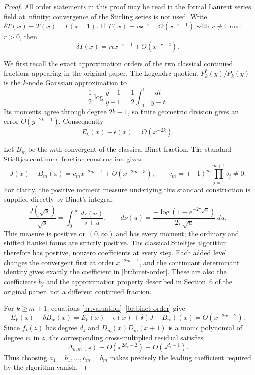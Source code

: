 \documentclass[11pt,a4paper]{article}
\theoremstyle{definition}
\theoremstyle{remark}
\numberwithin{equation}{section}
\begin{document}
\begin{proof}
All order statements in this proof may be read in the formal Laurent
series field at infinity; convergence of the Stirling series is not
used. Write $\delta T(x)=T(x)-T(x+1)$. If
$T(x)=c x^{-r}+O(x^{-r-1})$ with $c\ne0$ and $r>0$, then
\begin{equation}\label{br:valuation}
 \delta T(x)=r c x^{-r-1}+O(x^{-r-2}).
\end{equation}

We first recall the exact approximation orders of the two classical
continued fractions appearing in the original paper. The Legendre
quotient $P_k^*(y)/P_k(y)$ is the $k$-node Gaussian approximation to
\[
 \frac12\log\frac{y+1}{y-1}
       =\frac12\int_{-1}^1\frac{dt}{y-t}.
\]
Its moments agree through degree $2k-1$, so finite geometric
division gives an error $O(y^{-2k-1})$. Consequently
\begin{equation}\label{br:legendre-order}
 E_k(x)-\epsilon(x)=O(x^{-2k}).
\end{equation}

Let $B_m$ be the $m$th convergent of the classical Binet fraction.
The standard Stieltjes continued-fraction construction gives
\begin{equation}\label{br:binet-order}
 J(x)-B_m(x)=c_m x^{-2m-1}+O(x^{-2m-3}),
 \qquad c_m=(-1)^m\prod_{j=1}^{m+1}b_j\ne0.
\end{equation}
For clarity, the positive moment measure underlying this standard
construction is supplied directly by Binet's integral:
\[
 \frac{J(\sqrt s)}{\sqrt s}
 =\int_0^\infty\frac{d\nu(u)}{s+u},\qquad
 d\nu(u)=\frac{-\log(1-e^{-2\pi\sqrt u})}{2\pi\sqrt u}\,du.
\]
This measure is positive on $(0,\infty)$ and has every moment;
the ordinary and shifted Hankel forms are strictly positive.
The classical Stieltjes algorithm therefore has positive,
nonzero coefficients at every step. Each added level changes the
convergent first at order $x^{-2m-1}$, and the continuant determinant
identity gives exactly the coefficient in
\eqref{br:binet-order}. These are also the coefficients $b_j$ and
the approximation property described in Section~6 of the original
paper, not a different continued fraction.

For $k\ge m+1$, equations \eqref{br:valuation}--\eqref{br:binet-order}
give
\[
 E_k(x)-\delta B_m(x)
  =E_k(x)-\epsilon(x)+\delta(J-B_m)(x)
  =O(x^{-2m-2}).
\]
Since $f_k(z)$ has degree $d_k$ and
$D_m(x)D_m(x+1)$ is a monic polynomial of degree $m$ in $z$, the
corresponding cross-multiplied residual satisfies
\[
 \Delta_{k,m}(z)=O(x^{2d_k-2})=O(z^{d_k-1}).
\]
Thus choosing $a_1=b_1,\ldots,a_m=b_m$ makes precisely the
leading coefficient required by the algorithm vanish.


\end{proof}
\end{document}

